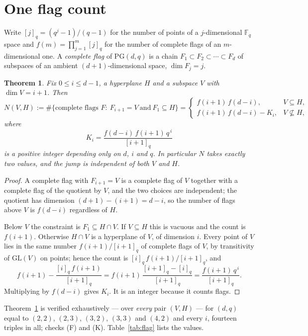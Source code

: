 \documentclass[11pt]{amsart}
\theoremstyle{plain}
\newtheorem{theorem}{Theorem}
\theoremstyle{definition}
\theoremstyle{remark}
\newcommand{\PG}{\mathrm{PG}}
\begin{document}
\section{One flag count}

Write $[j]_q=(q^{j}-1)/(q-1)$ for the number of points of a $j$-dimensional $\mathbb{F}_q$
space and $f(m)=\prod_{j=1}^{m}[j]_q$ for the number of complete flags of an $m$-dimensional
one. A \emph{complete flag} of $\PG(d,q)$ is a chain $F_1\subset F_2\subset\cdots\subset F_d$
of subspaces of an ambient $(d{+}1)$-dimensional space, $\dim F_j=j$.

\begin{theorem}\label{thm:flag}
Fix $0\le i\le d-1$, a hyperplane $H$ and a subspace $V$ with $\dim V=i+1$. Then
\[
  N(V,H):=\#\{\text{complete flags } F:\ F_{i+1}=V\ \text{and}\ F_1\subseteq H\}
  =\begin{cases}
     f(i+1)\,f(d-i), & V\subseteq H,\\[2pt]
     f(i+1)\,f(d-i)-K_i, & V\not\subseteq H,
   \end{cases}
\]
where
\[
  K_i=\frac{f(d-i)\,f(i+1)\,q^{\,i}}{[i+1]_q}
\]
is a positive integer depending only on $d$, $i$ and $q$. In particular $N$ takes exactly
two values, and the jump is independent of both $V$ and $H$.
\end{theorem}

\begin{proof}
A complete flag with $F_{i+1}=V$ is a complete flag of $V$ together with a complete flag of
the quotient by $V$, and the two choices are independent; the quotient has dimension
$(d+1)-(i+1)=d-i$, so the number of flags above $V$ is $f(d-i)$ regardless of $H$.

Below $V$ the constraint is $F_1\subseteq H\cap V$. If $V\subseteq H$ this is vacuous and the
count is $f(i+1)$. Otherwise $H\cap V$ is a hyperplane of $V$, of dimension $i$. Every point
of $V$ lies in the same number $f(i+1)/[i+1]_q$ of complete flags of $V$, by transitivity of
$\mathrm{GL}(V)$ on points; hence the count is $[i]_q\,f(i+1)/[i+1]_q$, and
\[
  f(i+1)-\frac{[i]_q\,f(i+1)}{[i+1]_q}
  =f(i+1)\,\frac{[i+1]_q-[i]_q}{[i+1]_q}
  =\frac{f(i+1)\,q^{\,i}}{[i+1]_q} .
\]
Multiplying by $f(d-i)$ gives $K_i$. It is an integer because it counts flags.
\end{proof}

Theorem~\ref{thm:flag} is verified exhaustively --- over \emph{every} pair $(V,H)$ --- for
$(d,q)$ equal to $(2,2)$, $(2,3)$, $(3,2)$, $(3,3)$ and $(4,2)$ and every $i$, fourteen
triples in all; checks
(F) and (K). Table~\ref{tab:flag} lists the values.
\end{document}
